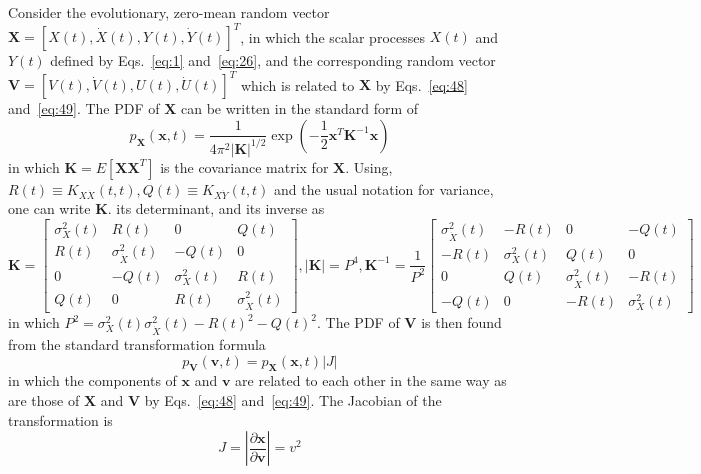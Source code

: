 \documentclass[12pt]{article}
\begin{document}
Consider the evolutionary, zero-mean random vector $\mathbf{X}=[X(t), \dot{X}(t), Y(t), \dot{Y}(t)]^{T}$, in which the scalar processes $X(t)$ and $Y(t)$ defined by Eqs.~\eqref{eq:1} and~\eqref{eq:26}, and the corresponding random vector $\mathbf{V}=[V(t), \dot{V}(t), U(t), \dot{U}(t)]^{T}$ which is related to $\mathbf{X}$ by Eqs.~\eqref{eq:48} and~\eqref{eq:49}. The PDF of $\mathbf{X}$ can be written in the standard form of
\begin{equation}
p_{\mathbf{X}}(\mathbf{x}, t)=\frac{1}{4 \pi^{2}|\mathbf{K}|^{1 / 2}} \exp \left(-\frac{1}{2} \mathbf{x}^{T} \mathbf{K}^{-1} \mathbf{x}\right)
\label{eq:A1}
\end{equation}
in which $\mathbf{K}=E\left[\mathbf{X}\mathbf{X}^{T}\right]$ is the covariance matrix for $\mathbf{X}$. Using, $R(t) \equiv K_{X \dot{X}}(t, t), Q(t) \equiv K_{X \dot{Y}}(t, t)$ and the usual notation for variance, one can write $\mathbf{K}$. its determinant, and its inverse as
\begin{equation}
\mathbf{K}=\left[\begin{array}{cccc}
\sigma_{X}^{2}(t) & R(t) & 0 & Q(t) \\
R(t) & \sigma_{\dot{X}}^{2}(t) & -Q(t) & 0 \\
0 & -Q(t) & \sigma_{X}^{2}(t) & R(t) \\
Q(t) & 0 & R(t) & \sigma_{\dot{X}}^{2}(t)
\end{array}\right],|\mathbf{K}|=P^{4}, \mathbf{K}^{-1}=\frac{1}{P^{2}}\left[\begin{array}{cccc}
\sigma_{\dot{X}}^{2}(t) & -R(t) & 0 & -Q(t) \\
-R(t) & \sigma_{X}^{2}(t) & Q(t) & 0 \\
0 & Q(t) & \sigma_{\dot{X}}^{2}(t) & -R(t) \\
-Q(t) & 0 & -R(t) & \sigma_{X}^{2}(t)
\end{array}\right]
\label{eq:A2}
\end{equation}
in which $P^{2}=\sigma_{X}^{2}(t) \sigma_{\dot{X}}^{2}(t)-R(t)^{2}-Q(t)^{2}$. The PDF of $\mathbf{V}$ is then found from the standard transformation formula
\begin{equation}
p_{\mathbf{V}}(\mathbf{v}, t)=p_{\mathbf{X}}(\mathbf{x}, t)|J|
\label{eq:A3}
\end{equation}
in which the components of $\mathbf{x}$ and $\mathbf{v}$ are related to each other in the same way as are those of $\mathbf{X}$ and $\mathbf{V}$ by Eqs.~\eqref{eq:48} and~\eqref{eq:49}. The Jacobian of the transformation is
\begin{equation}
J=\left|\frac{\partial \mathbf{x}}{\partial \mathbf{v}}\right|=v^{2}
\label{eq:A4}
\end{equation}
\end{document}
